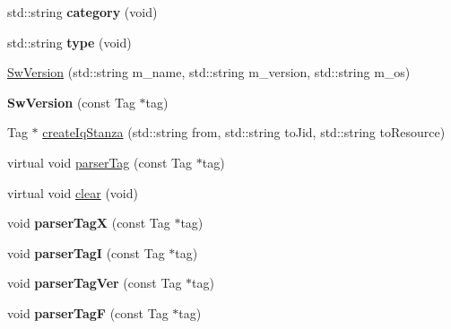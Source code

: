 \begin{DoxyCompactItemize}
\item 
\hypertarget{classSwVersion_a47dc58f090b7da6f2103ae1eec719dbf}{
std::string {\bfseries category} (void)}
\label{classSwVersion_a47dc58f090b7da6f2103ae1eec719dbf}

\item 
\hypertarget{classSwVersion_a815d477fb4f5f877f10b7a2ddaa70314}{
std::string {\bfseries type} (void)}
\label{classSwVersion_a815d477fb4f5f877f10b7a2ddaa70314}

\item 
\hyperlink{classSwVersion_abc38b80ac0896aeebb828deab1ef2320}{SwVersion} (std::string m\_\-name, std::string m\_\-version, std::string m\_\-os)
\item 
\hypertarget{classSwVersion_a028bd569626014821b5c4d115ef4d965}{
{\bfseries SwVersion} (const Tag $\ast$tag)}
\label{classSwVersion_a028bd569626014821b5c4d115ef4d965}

\item 
Tag $\ast$ \hyperlink{classSwVersion_a989c4d9be7fe8a04856723f37b78379c}{createIqStanza} (std::string from, std::string toJid, std::string toResource)
\item 
virtual void \hyperlink{classSwVersion_a3941095835fe5625aab29bef5e644f21}{parserTag} (const Tag $\ast$tag)
\item 
virtual void \hyperlink{classSwVersion_a2083d816b33f6274af03074c6ac21c5e}{clear} (void)
\item 
\hypertarget{classSwVersion_a7ce6ba9a0884cda95993b822a86b0516}{
void {\bfseries parserTagX} (const Tag $\ast$tag)}
\label{classSwVersion_a7ce6ba9a0884cda95993b822a86b0516}

\item 
\hypertarget{classSwVersion_a500b4d0615136d46cb457d1932d6a6ce}{
void {\bfseries parserTagI} (const Tag $\ast$tag)}
\label{classSwVersion_a500b4d0615136d46cb457d1932d6a6ce}

\item 
\hypertarget{classSwVersion_a67ca2390bb0b6c021ab95ec1c2081fcc}{
void {\bfseries parserTagVer} (const Tag $\ast$tag)}
\label{classSwVersion_a67ca2390bb0b6c021ab95ec1c2081fcc}

\item 
\hypertarget{classSwVersion_ae68e0b94e5c753dd7e8fa9ac2ed7b7d4}{
void {\bfseries parserTagF} (const Tag $\ast$tag)}
\label{classSwVersion_ae68e0b94e5c753dd7e8fa9ac2ed7b7d4}

\end{DoxyCompactItemize}
